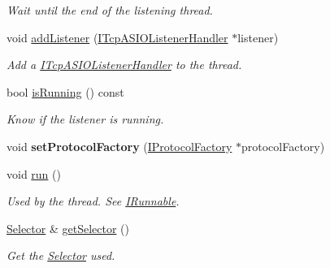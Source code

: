 \begin{DoxyCompactItemize}
\begin{DoxyCompactList}\small\item\em Wait until the end of the listening thread. \end{DoxyCompactList}\item 
void \hyperlink{classmognetwork_1_1_tcp_a_s_i_o_listener_a0d0b24852fdd94ad5096a87a40bc7712}{add\-Listener} (\hyperlink{classmognetwork_1_1_i_tcp_a_s_i_o_listener_handler}{I\-Tcp\-A\-S\-I\-O\-Listener\-Handler} $\ast$listener)
\begin{DoxyCompactList}\small\item\em Add a \hyperlink{classmognetwork_1_1_i_tcp_a_s_i_o_listener_handler}{I\-Tcp\-A\-S\-I\-O\-Listener\-Handler} to the thread. \end{DoxyCompactList}\item 
bool \hyperlink{classmognetwork_1_1_tcp_a_s_i_o_listener_a431eb0fb3fab8042a9ef0b79d706fffc}{is\-Running} () const 
\begin{DoxyCompactList}\small\item\em Know if the listener is running. \end{DoxyCompactList}\item 
\hypertarget{classmognetwork_1_1_tcp_a_s_i_o_listener_a4a55377778098698900de6e246d42cc7}{void {\bfseries set\-Protocol\-Factory} (\hyperlink{classmognetwork_1_1_i_protocol_factory}{I\-Protocol\-Factory} $\ast$protocol\-Factory)}\label{classmognetwork_1_1_tcp_a_s_i_o_listener_a4a55377778098698900de6e246d42cc7}

\item 
\hypertarget{classmognetwork_1_1_tcp_a_s_i_o_listener_a445dcd4bf6dfe75c7715af0fecf9494d}{void \hyperlink{classmognetwork_1_1_tcp_a_s_i_o_listener_a445dcd4bf6dfe75c7715af0fecf9494d}{run} ()}\label{classmognetwork_1_1_tcp_a_s_i_o_listener_a445dcd4bf6dfe75c7715af0fecf9494d}

\begin{DoxyCompactList}\small\item\em Used by the thread. See \hyperlink{classmognetwork_1_1_i_runnable}{I\-Runnable}. \end{DoxyCompactList}\item 
\hyperlink{classmognetwork_1_1_selector}{Selector} \& \hyperlink{classmognetwork_1_1_tcp_a_s_i_o_listener_aed4473511088d8bc91ce118334eed24d}{get\-Selector} ()
\begin{DoxyCompactList}\small\item\em Get the \hyperlink{classmognetwork_1_1_selector}{Selector} used. \end{DoxyCompactList}\end{DoxyCompactItemize}


